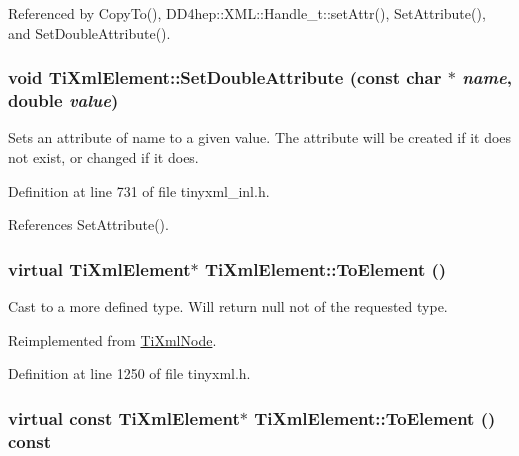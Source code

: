 Referenced by CopyTo(), DD4hep::XML::Handle\_\-t::setAttr(), SetAttribute(), and SetDoubleAttribute().\hypertarget{class_ti_xml_element_a0d1dd975d75496778177e35abfe0ec0b}{
\subsubsection[{SetDoubleAttribute}]{\setlength{\rightskip}{0pt plus 5cm}void TiXmlElement::SetDoubleAttribute (const char $\ast$ {\em name}, \/  double {\em value})}}
\label{class_ti_xml_element_a0d1dd975d75496778177e35abfe0ec0b}
Sets an attribute of name to a given value. The attribute will be created if it does not exist, or changed if it does. 

Definition at line 731 of file tinyxml\_\-inl.h.

References SetAttribute().\hypertarget{class_ti_xml_element_a9def86337ea7a755eb41cac980f60c7a}{
\subsubsection[{ToElement}]{\setlength{\rightskip}{0pt plus 5cm}virtual {\bf TiXmlElement}$\ast$ TiXmlElement::ToElement ()}}
\label{class_ti_xml_element_a9def86337ea7a755eb41cac980f60c7a}


Cast to a more defined type. Will return null not of the requested type. 

Reimplemented from \hyperlink{class_ti_xml_node_aa65d000223187d22a4dcebd7479e9ebc}{TiXmlNode}.

Definition at line 1250 of file tinyxml.h.\hypertarget{class_ti_xml_element_ac5b8d0e25fa23fd9acbb6d146082901c}{
\subsubsection[{ToElement}]{\setlength{\rightskip}{0pt plus 5cm}virtual const {\bf TiXmlElement}$\ast$ TiXmlElement::ToElement () const}}
\label{class_ti_xml_element_ac5b8d0e25fa23fd9acbb6d146082901c}


